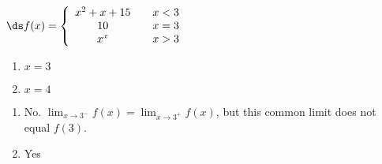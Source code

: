{$\ds f(x) = \left\{\begin{array}{ccc}
x^2+x+15		& &  x< 3\\
10	& &  x=3\\
x^x & & x> 3
\end{array}\right.
$
\begin{enumerate}
\item		$x=3$
\item		$x=4$
\end{enumerate}
}
{\begin{enumerate}
\item		No. $\lim_{x\rightarrow 3^-}f(x)=\lim_{x\rightarrow 3^+}f(x)$, but this common limit does not equal $f(3)$.
\item		Yes
\end{enumerate}
}
